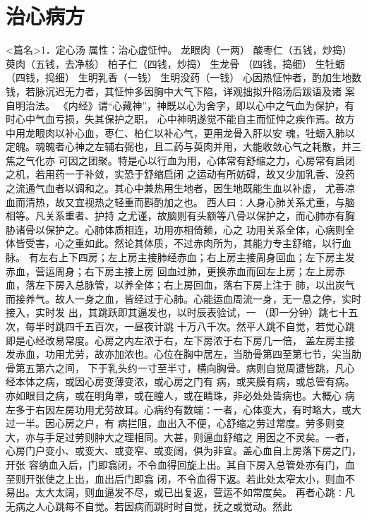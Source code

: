 \documentclass[a4paper,12pt,UTF8,twoside]{ctexbook}
\begin{document}
\chapter{治心病方}
<篇名>1．定心汤
属性：治心虚怔忡。 
龙眼肉（一两） 酸枣仁（五钱，炒捣） 萸肉（五钱，去净核） 柏子仁（四钱，炒捣） 生龙骨 
（四钱，捣细） 生牡蛎（四钱，捣细） 生明乳香（一钱） 生明没药（一钱） 
心因热怔忡者，酌加生地数钱，若脉沉迟无力者，其怔忡多因胸中大气下陷，详观拙拟升陷汤后跋语及诸 
案自明治法。 
《内经》谓“心藏神”，神既以心为舍字，即以心中之气血为保护，有时心中气血亏损，失其保护之职， 
心中神明遂觉不能自主而怔忡之疾作焉。故方中用龙眼肉以补心血，枣仁、柏仁以补心气，更用龙骨入肝以安 
魂，牡蛎入肺以定魄。魂魄者心神之左辅右弼也，且二药与萸肉并用，大能收敛心气之耗散，并三焦之气化亦 
可因之团聚。特是心以行血为用，心体常有舒缩之力，心房常有启闭之机，若用药一于补敛，实恐于舒缩启闭 
之运动有所妨碍，故又少加乳香、没药之流通气血者以调和之。其心中兼热用生地者，因生地既能生血以补虚， 
尤善凉血而清热，故又宜视热之轻重而斟酌加之也。 
西人曰∶人身心肺关系尤重，与脑相等。凡关系重者、护持 
之尤谨，故脑则有头额等八骨以保护之，而心肺亦有胸胁诸骨以保护之。心肺体质相连，功用亦相倚赖，心之 
功用关系全体，心病则全体皆受害，心之重如此。然论其体质，不过赤肉所为，其能力专主舒缩，以行血脉。 
有左右上下四房；左上房主接肺经赤血；右上房主接周身回血；左下房主发赤血，营运周身；右下房主接上房 
回血过肺，更换赤血而回左上房；左上房赤血，落左下房入总脉管，以养全体；右上房回血，落右下房上注于 
肺，以出炭气而接养气。故人一身之血，皆经过于心肺。心能运血周流一身，无一息之停，实时接入，实时发 
出，其跳跃即其逼发也，以时辰表验试，一 （即一分钟）跳七十五次，每半时跳四千五百次，一昼夜计跳 
十万八千次。然平人跳不自觉，若觉心跳即是心经改易常度。心房之内左浓于右，左下房浓于右下房几一倍， 
盖左房主接发赤血，功用尤劳，故亦加浓也。心位在胸中居左，当肋骨第四至第七节，尖当肋骨第五第六之间， 
下于乳头约一寸至半寸，横向胸骨。病则自觉周遭皆跳，凡心经本体之病，或因心房变薄变浓，或心房之门有 
病，或夹膜有病，或总管有病。亦如眼目之病，或在明角罩，或在瞳人，或在睛珠，非必处处皆病也。大概心 
病左多于右因左房功用尤劳故耳。心病约有数端∶一者，心体变大，有时略大，或大过一半。因心房之户，有 
病拦阻，血出入不便，心舒缩之劳过常度。劳多则变大，亦与手足过劳则肿大之理相同。大甚，则逼血舒缩之 
用因之不灵矣。一者，心房门户变小、或变大、或变窄、或变阔，俱为非宜。盖心血自上房落下房之门，开张 
容纳血入后，门即翕闭，不令血得回旋上出。其自下房入总管处亦有门，血至则开张使之上出，血出后门即翕 
闭，不令血得下返。若此处太窄太小，则血不易出。太大太阔，则血逼发不尽，或已出复返，营运不如常度矣。 
再者心跳∶凡无病之人心跳每不自觉。若因病而跳时时自觉，抚之或觉动。然此 
\end{document}
